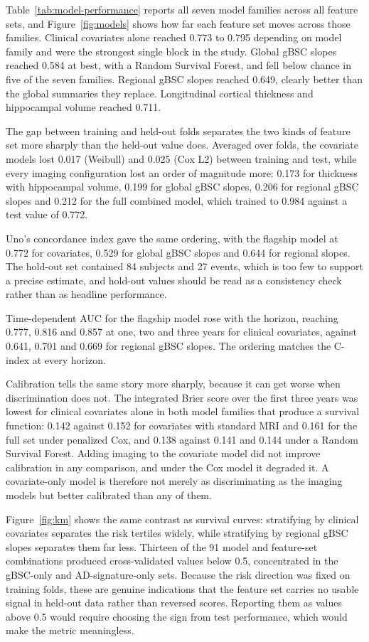 \documentclass[blue]{ludusofficial}  %
\begin{document}
Table~\ref{tab:model-performance} reports all seven model families across all feature sets, and Figure~\ref{fig:models} shows how far each feature set moves across those families. Clinical covariates alone reached 0.773 to 0.795 depending on model family and were the strongest single block in the study. Global gBSC slopes reached 0.584 at best, with a Random Survival Forest, and fell below chance in five of the seven families. Regional gBSC slopes reached 0.649, clearly better than the global summaries they replace. Longitudinal cortical thickness and hippocampal volume reached 0.711.

The gap between training and held-out folds separates the two kinds of feature set more sharply than the held-out value does. Averaged over folds, the covariate models lost 0.017 (Weibull) and 0.025 (Cox L2) between training and test, while every imaging configuration lost an order of magnitude more: 0.173 for thickness with hippocampal volume, 0.199 for global gBSC slopes, 0.206 for regional gBSC slopes and 0.212 for the full combined model, which trained to 0.984 against a test value of 0.772.

Uno's concordance index gave the same ordering, with the flagship model at 0.772 for covariates, 0.529 for global gBSC slopes and 0.644 for regional slopes. The hold-out set contained 84 subjects and 27 events, which is too few to support a precise estimate, and hold-out values should be read as a consistency check rather than as headline performance.

Time-dependent AUC for the flagship model rose with the horizon, reaching 0.777, 0.816 and 0.857 at one, two and three years for clinical covariates, against 0.641, 0.701 and 0.669 for regional gBSC slopes. The ordering matches the C-index at every horizon.

Calibration tells the same story more sharply, because it can get worse when discrimination does not. The integrated Brier score over the first three years was lowest for clinical covariates alone in both model families that produce a survival function: 0.142 against 0.152 for covariates with standard MRI and 0.161 for the full set under penalized Cox, and 0.138 against 0.141 and 0.144 under a Random Survival Forest. Adding imaging to the covariate model did not improve calibration in any comparison, and under the Cox model it degraded it. A covariate-only model is therefore not merely as discriminating as the imaging models but better calibrated than any of them.

Figure~\ref{fig:km} shows the same contrast as survival curves: stratifying by clinical covariates separates the risk tertiles widely, while stratifying by regional gBSC slopes separates them far less. Thirteen of the 91 model and feature-set combinations produced cross-validated values below 0.5, concentrated in the gBSC-only and AD-signature-only sets. Because the risk direction was fixed on training folds, these are genuine indications that the feature set carries no usable signal in held-out data rather than reversed scores. Reporting them as values above 0.5 would require choosing the sign from test performance, which would make the metric meaningless.
\end{document}
